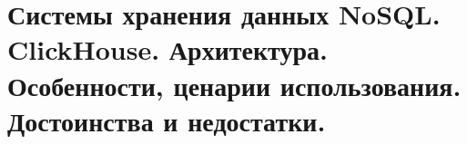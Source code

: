 \section{Системы хранения данных NoSQL. ClickHouse. Архитектура. Особенности, ценарии использования. Достоинства и недостатки.}
